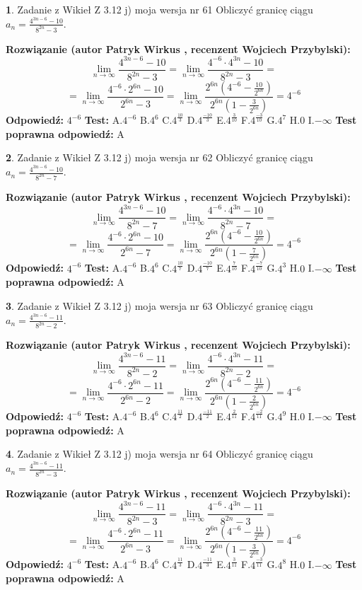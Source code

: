 \documentclass[12pt, a4paper]{article}
\theoremstyle{definition} %
\newtheorem{zad}{}
\newcommand{\zadStart}[1]{\begin{zad}#1\newline}
\newcommand{\zadStop}{\end{zad}}
\newcommand{\rozwStart}[2]{\noindent \textbf{Rozwiązanie (autor #1 , recenzent #2): }\newline}
\newcommand{\rozwStop}{\newline}
\newcommand{\odpStart}{\noindent \textbf{Odpowiedź:}\newline}
\newcommand{\odpStop}{\newline}
\newcommand{\testStart}{\noindent \textbf{Test:}\newline}
\newcommand{\testStop}{\newline}
\newcommand{\kluczStart}{\noindent \textbf{Test poprawna odpowiedź:}\newline}
\newcommand{\kluczStop}{\newline}
\begin{document}
\zadStart{Zadanie z Wikieł Z 3.12 j) moja wersja nr 61}
Obliczyć granicę ciągu $a_{n}=\frac{4^{3n-6}-10}{8^{2n}-3}$.
\zadStop
\rozwStart{Patryk Wirkus}{Wojciech Przybylski}
$$\lim\limits_{n\to\infty}\frac{4^{3n-6}-10}{8^{2n}-3}= \lim\limits_{n\to\infty}\frac{4^{-6} \cdot 4^{3n}-10}{8^{2n}-3}=$$
$$= \lim\limits_{n\to\infty}\frac{4^{-6} \cdot 2^{6n}-10}{2^{6n}-3}= \lim\limits_{n\to\infty}\frac{2^{6n}(4^{-6} - \frac{10}{2^{6n}})}{2^{6n}(1-\frac{3}{2^{6n}})}= 4^{-6}$$
\rozwStop
\odpStart
$4^{-6}$
\odpStop
\testStart
A.$4^{-6}$
B.$4^{6}$
C.$4^{\frac{10}{3}}$
D.$4^{\frac{-10}{3}}$
E.$4^{\frac{3}{10}}$
F.$4^{\frac{-3}{10}}$
G.$4^{7}$
H.$0$
I.$-\infty$
\testStop
\kluczStart
A
\kluczStop



\zadStart{Zadanie z Wikieł Z 3.12 j) moja wersja nr 62}
Obliczyć granicę ciągu $a_{n}=\frac{4^{3n-6}-10}{8^{2n}-7}$.
\zadStop
\rozwStart{Patryk Wirkus}{Wojciech Przybylski}
$$\lim\limits_{n\to\infty}\frac{4^{3n-6}-10}{8^{2n}-7}= \lim\limits_{n\to\infty}\frac{4^{-6} \cdot 4^{3n}-10}{8^{2n}-7}=$$
$$= \lim\limits_{n\to\infty}\frac{4^{-6} \cdot 2^{6n}-10}{2^{6n}-7}= \lim\limits_{n\to\infty}\frac{2^{6n}(4^{-6} - \frac{10}{2^{6n}})}{2^{6n}(1-\frac{7}{2^{6n}})}= 4^{-6}$$
\rozwStop
\odpStart
$4^{-6}$
\odpStop
\testStart
A.$4^{-6}$
B.$4^{6}$
C.$4^{\frac{10}{7}}$
D.$4^{\frac{-10}{7}}$
E.$4^{\frac{7}{10}}$
F.$4^{\frac{-7}{10}}$
G.$4^{3}$
H.$0$
I.$-\infty$
\testStop
\kluczStart
A
\kluczStop



\zadStart{Zadanie z Wikieł Z 3.12 j) moja wersja nr 63}
Obliczyć granicę ciągu $a_{n}=\frac{4^{3n-6}-11}{8^{2n}-2}$.
\zadStop
\rozwStart{Patryk Wirkus}{Wojciech Przybylski}
$$\lim\limits_{n\to\infty}\frac{4^{3n-6}-11}{8^{2n}-2}= \lim\limits_{n\to\infty}\frac{4^{-6} \cdot 4^{3n}-11}{8^{2n}-2}=$$
$$= \lim\limits_{n\to\infty}\frac{4^{-6} \cdot 2^{6n}-11}{2^{6n}-2}= \lim\limits_{n\to\infty}\frac{2^{6n}(4^{-6} - \frac{11}{2^{6n}})}{2^{6n}(1-\frac{2}{2^{6n}})}= 4^{-6}$$
\rozwStop
\odpStart
$4^{-6}$
\odpStop
\testStart
A.$4^{-6}$
B.$4^{6}$
C.$4^{\frac{11}{2}}$
D.$4^{\frac{-11}{2}}$
E.$4^{\frac{2}{11}}$
F.$4^{\frac{-2}{11}}$
G.$4^{9}$
H.$0$
I.$-\infty$
\testStop
\kluczStart
A
\kluczStop



\zadStart{Zadanie z Wikieł Z 3.12 j) moja wersja nr 64}
Obliczyć granicę ciągu $a_{n}=\frac{4^{3n-6}-11}{8^{2n}-3}$.
\zadStop
\rozwStart{Patryk Wirkus}{Wojciech Przybylski}
$$\lim\limits_{n\to\infty}\frac{4^{3n-6}-11}{8^{2n}-3}= \lim\limits_{n\to\infty}\frac{4^{-6} \cdot 4^{3n}-11}{8^{2n}-3}=$$
$$= \lim\limits_{n\to\infty}\frac{4^{-6} \cdot 2^{6n}-11}{2^{6n}-3}= \lim\limits_{n\to\infty}\frac{2^{6n}(4^{-6} - \frac{11}{2^{6n}})}{2^{6n}(1-\frac{3}{2^{6n}})}= 4^{-6}$$
\rozwStop
\odpStart
$4^{-6}$
\odpStop
\testStart
A.$4^{-6}$
B.$4^{6}$
C.$4^{\frac{11}{3}}$
D.$4^{\frac{-11}{3}}$
E.$4^{\frac{3}{11}}$
F.$4^{\frac{-3}{11}}$
G.$4^{8}$
H.$0$
I.$-\infty$
\testStop
\kluczStart
A
\kluczStop
\end{document}
